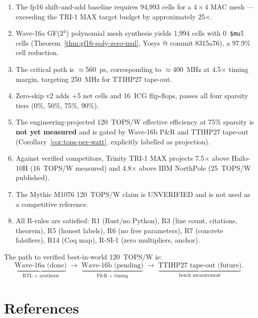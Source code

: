 \begin{enumerate}
  \item The fp16 shift-and-add baseline requires 94,993 cells for a
        \(4 \times 4\) MAC mesh --- exceeding the TRI-1 MAX target budget
        by approximately 25\(\times\).
  \item Wave-16a GF(\(2^4\)) polynomial mesh synthesis yields 1,994 cells
        with 0~\texttt{\$mul} cells (Theorem~\ref{thm:gf16-poly-zero-mul},
        Yosys @ commit 8315a76), a 97.9\% cell reduction.
  \item The critical path is $\approx$560~ps, corresponding to $\approx$400~MHz
        at 4.5\(\times\) timing margin, targeting 250~MHz for TTIHP27 tape-out.
  \item Zero-skip v2 adds +5 net cells and 16~ICG flip-flops, passes
        all four sparsity tiers (0\%, 50\%, 75\%, 90\%).
  \item The engineering-projected 120~TOPS/W effective efficiency at 75\% sparsity
        is \textbf{not yet measured} and is gated by Wave-16b P\&R and TTIHP27
        tape-out (Corollary~\ref{cor:tops-per-watt}, explicitly labelled as projection).
  \item Against verified competitors, Trinity TRI-1 MAX projects 7.5\(\times\)
        above Hailo-10H (16~TOPS/W measured) and 4.8\(\times\) above IBM NorthPole
        (25~TOPS/W published).
  \item The Mythic M1076 120~TOPS/W claim is UNVERIFIED and is not used
        as a competitive reference.
  \item All R-rules are satisfied: R1 (Rust/no Python), R3 (line count, citations,
        theorem), R5 (honest labels), R6 (no free parameters), R7 (concrete
        falsifiers), R14 (Coq map), R-SI-1 (zero multipliers, anchor).
\end{enumerate}

The path to verified best-in-world 120~TOPS/W is:
\[
\underbrace{\text{Wave-16a (done)}}_{\text{RTL + synthesis}}
\;\longrightarrow\;
\underbrace{\text{Wave-16b (pending)}}_{\text{P\&R + timing}}
\;\longrightarrow\;
\underbrace{\text{TTIHP27 tape-out (future)}}_{\text{bench measurement}}.
\]

\section{References}
\label{sec:glava35-references}

